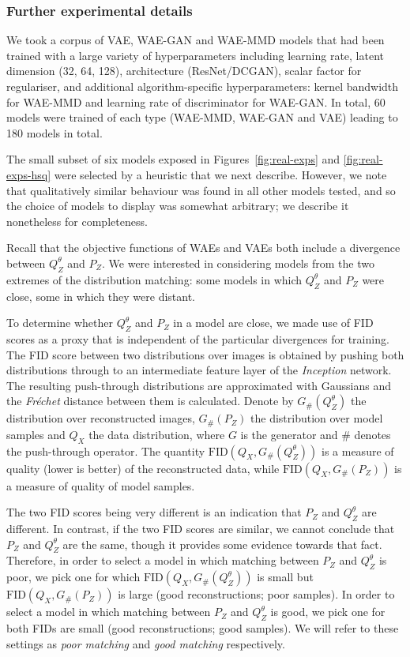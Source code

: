 \subsubsection{Further experimental details}

We took a corpus of VAE, WAE-GAN and WAE-MMD models that had been trained with a large variety of hyperparameters including learning rate, latent dimension (32, 64, 128), architecture (ResNet/DCGAN), scalar factor for regulariser, and additional algorithm-specific hyperparameters: kernel bandwidth for WAE-MMD and learning rate of discriminator for WAE-GAN.
In total, 60 models were trained of each type (WAE-MMD, WAE-GAN and VAE) leading to 180 models in total.

The small subset of six models exposed in Figures~\ref{fig:real-exps} and \ref{fig:real-exps-hsq} were selected by a heuristic that we next describe. However, we note that qualitatively similar behaviour was found in all other models tested, and so the choice of models to display was somewhat arbitrary; we describe it nonetheless for completeness.

Recall that the objective functions of WAEs and VAEs both include a divergence between $Q^\theta_Z$ and $P_Z$.
We were interested in considering models from the two extremes of the distribution matching: some models in which $Q^\theta_Z$ and $P_Z$ were close, some in which they were distant.

To determine whether $Q^\theta_Z$ and $P_Z$ in a model are close, we made use of FID \cite{heusel2017gans} scores as a proxy that is independent of the particular divergences for training.
The FID score between two distributions over images is obtained by pushing both distributions through to an intermediate feature layer of the \emph{Inception} network.
The resulting push-through distributions are approximated with Gaussians and the \emph{Fr\'echet} distance between them is calculated.
Denote by $G_\#(Q^\theta_Z)$ the distribution over reconstructed images, $G_\#(P_Z)$ the distribution over model samples and $Q_X$ the data distribution, where $G$ is the generator and $\#$ denotes the push-through operator. 
The quantity $\text{FID}\left(Q_X, G_\#(Q^\theta_Z)\right)$ is a measure of quality (lower is better) of the reconstructed data,
while $\text{FID}\left(Q_X, G_\#(P_Z)\right)$ is a measure of quality of model samples.

The two FID scores being very different is an indication that $P_Z$ and $Q^\theta_Z$ are different.
In contrast, if the two FID scores are similar, we cannot conclude that $P_Z$ and $Q^\theta_Z$ are the same, though it provides some evidence towards that fact.
Therefore, in order to select a model in which matching between $P_Z$ and $Q^\theta_Z$ is poor, we pick one for which $\text{FID}\left(Q_X, G_\#(Q^\theta_Z)\right)$ is small but $\text{FID}\left(Q_X, G_\#(P_Z)\right)$ is large (good reconstructions; poor samples).
In order to select a model in which matching between $P_Z$ and $Q^\theta_Z$ is good, we pick one for both FIDs are small (good reconstructions; good samples). 
We will refer to these settings as \emph{poor matching} and \emph{good matching} respectively.

